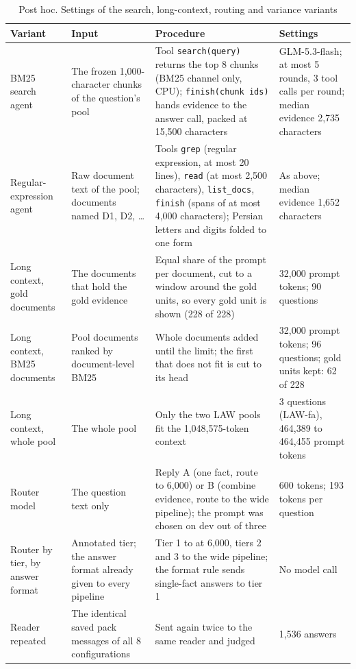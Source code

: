 \begin{table}[tp]
\caption{Post hoc. Settings of the search, long-context, routing and variance variants}
\label{tab:posthoc-settings2}
\centering
\scriptsize
\setlength{\tabcolsep}{3pt}
\begin{tabularx}{\textwidth}{@{}p{2.6cm}p{2.9cm}Xp{2.8cm}@{}}
\toprule
Variant & Input & Procedure & Settings \\
\midrule
BM25 search agent & The frozen 1,000-character chunks of the question's pool & Tool \texttt{search(query)} returns the top 8 chunks (BM25 channel only, CPU); \texttt{finish(chunk ids)} hands evidence to the answer call, packed at 15,500 characters & GLM-5.3-flash; at most 5 rounds, 3 tool calls per round; median evidence 2,735 characters \\
Regular-expression agent & Raw document text of the pool; documents named D1, D2, \ldots & Tools \texttt{grep} (regular expression, at most 20 lines), \texttt{read} (at most 2,500 characters), \texttt{list\_docs}, \texttt{finish} (spans of at most 4,000 characters); Persian letters and digits folded to one form & As above; median evidence 1,652 characters \\
Long context, gold documents & The documents that hold the gold evidence & Equal share of the prompt per document, cut to a window around the gold units, so every gold unit is shown (228 of 228) & 32,000 prompt tokens; 90 questions \\
Long context, BM25 documents & Pool documents ranked by document-level BM25 & Whole documents added until the limit; the first that does not fit is cut to its head & 32,000 prompt tokens; 96 questions; gold units kept: 62 of 228 \\
Long context, whole pool & The whole pool & Only the two LAW pools fit the 1,048,575-token context & 3 questions (LAW-fa), 464,389 to 464,455 prompt tokens \\
Router model & The question text only & Reply A (one fact, route to \hybrid{} 6,000) or B (combine evidence, route to the wide pipeline); the prompt was chosen on dev out of three & 600 tokens; 193 tokens per question \\
Router by tier, by answer format & Annotated tier; the answer format already given to every pipeline & Tier 1 to \hybrid{} at 6,000, tiers 2 and 3 to the wide pipeline; the format rule sends single-fact answers to tier 1 & No model call \\
Reader repeated & The identical saved pack messages of all 8 configurations & Sent again twice to the same reader and judged & 1,536 answers \\

\end{tabularx}
\end{table}
